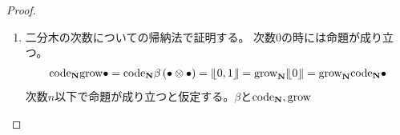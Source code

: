 {\begin{proof}
\begin{enumerate}
			次数$0$の時には命題が成り立つ。
			\begin{equation*}\begin{split}
				\code_\sizen\opN\bullet = \code_\sizen0 = 0 
				= \opN_\sizen\word{0} = \opN_\sizen\code_\sizen\bullet
			\end{split}\end{equation*}
			次数$n$以下で命題が成り立つと仮定する。$\beta$と$\code_\sizen,\opN$
			との交換関係から次の式が成り立つ。
			\begin{equation*}\begin{split}
				\code_\sizen\opN\beta 
				= m_0\plr{1\otimes\opR_+}\plr{\code_\sizen\otimes\code_\sizen}
					\plr{\opN\otimes1 + 1\otimes\opN + 1\otimes1} \\
			\end{split}\end{equation*}
			任意の$r,s\le n$に対して、$\clB_r\otimes\clB_s$に作用させると、
			帰納法の仮定から次の式が成り立ち、
			\begin{equation*}\begin{split}
				& \code_\sizen\opN\beta\plr{\clB_r\otimes\clB_s} \\
				&= m_0\plr{1\otimes\opR_+}\plr{\code_\sizen\otimes\code_\sizen}
					\plr{\opN\otimes1 + 1\otimes\opN + 1\otimes1}
					\plr{\clB_r\otimes\clB_s} \\
				&= m_0\plr{1\otimes\opR_+}
					\plr{\opN_\sizen\otimes1 + 1\otimes\opN_\sizen + 1\otimes1}
					\plr{\code_\sizen\otimes\code_\sizen}
					\plr{\clB_r\otimes\clB_s} \\
				&= m_0\plr{\opN_\sizen\otimes1 + 1\otimes\opN_\sizen}
					\plr{1\otimes\opR_+}
					\plr{\code_\sizen\otimes\code_\sizen}
					\plr{\clB_r\otimes\clB_s} \\
				&= \opN_\sizen\code_\sizen\beta\plr{\clB_r\otimes\clB_s} \\
			\end{split}\end{equation*}
			次数が$n+1$でも命題が成り立つことがわかる。
			\item 二分木の次数についての帰納法で証明する。
			次数$0$の時には命題が成り立つ。
			\begin{equation*}\begin{split}
				{\mathinner{\operatorname{code}}}_{\mathbf{N}}{\mathinner{\operatorname{grow}}}\bullet 
				= {\mathinner{\operatorname{code}}}_{\mathbf{N}}\beta\mathinner{({\bullet\otimes\bullet})} = {|\!\lfloor{0,1}\rfloor\!|}
				= {\mathinner{\operatorname{grow}}}_{\mathbf{N}}{|\!\lfloor{0}\rfloor\!|} = {\mathinner{\operatorname{grow}}}_{\mathbf{N}}{\mathinner{\operatorname{code}}}_{\mathbf{N}}\bullet
			\end{split}\end{equation*}
			次数$n$以下で命題が成り立つと仮定する。$\beta$と${\mathinner{\operatorname{code}}}_{\mathbf{N}},{\mathinner{\operatorname{grow}}}$

\end{enumerate}
\end{proof}}

